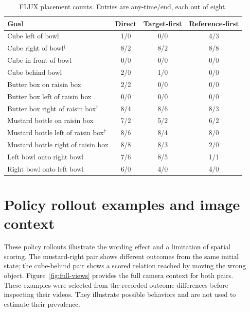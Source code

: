 \documentclass{article}
\begin{document}
\begin{table}[htbp]\centering\small
\caption{FLUX placement counts. Entries are any-time/end, each out of eight.}
\begin{tabular}{@{}p{.48\linewidth}ccc@{}}\toprule Goal & Direct & Target-first & Reference-first\\\midrule

Cube left of bowl & 1/0 & 0/0 & 4/3\\

Cube right of bowl$^\dagger$ & 8/2 & 8/2 & 8/8\\

Cube in front of bowl & 0/0 & 0/0 & 0/0\\

Cube behind bowl & 2/0 & 1/0 & 0/0\\

Butter box on raisin box & 2/2 & 0/0 & 0/0\\

Butter box left of raisin box & 0/0 & 0/0 & 0/0\\

Butter box right of raisin box$^\dagger$ & 8/4 & 8/6 & 8/3\\

Mustard bottle on raisin box & 7/2 & 5/2 & 6/2\\

Mustard bottle left of raisin box$^\dagger$ & 8/6 & 8/4 & 8/0\\

Mustard bottle right of raisin box & 8/8 & 8/3 & 2/0\\

Left bowl onto right bowl & 7/6 & 8/5 & 1/1\\

Right bowl onto left bowl & 6/0 & 4/0 & 4/0\\

\bottomrule\end{tabular}\end{table}

\FloatBarrier
\section{Policy rollout examples and image context}
\label{app:executions}
These policy rollouts illustrate the wording effect and a limitation of spatial scoring. The mustard-right pair shows different outcomes from the same initial state; the cube-behind pair shows a scored relation reached by moving the wrong object. Figure~\ref{fig:full-views} provides the full camera context for both pairs. These examples were selected from the recorded outcome differences before inspecting their videos. They illustrate possible behaviors and are not used to estimate their prevalence.
\end{document}

